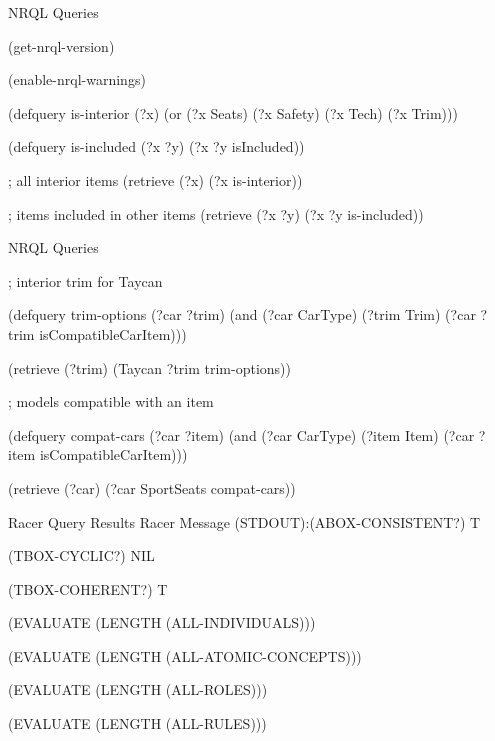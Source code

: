 \documentclass{beamer}
\begin{document}
\begin{frame}{NRQL Queries}
\begin{examples}
(get-nrql-version)
    
(enable-nrql-warnings)

(defquery is-interior (?x) (or (?x Seats) (?x Safety) (?x Tech) (?x Trim)))

(defquery is-included (?x ?y) (?x ?y isIncluded))

; all interior items
(retrieve (?x) (?x is-interior))

; items included in other items
(retrieve (?x ?y) (?x ?y is-included))

\end{examples}
\end{frame}

\begin{frame}{NRQL Queries}
\begin{examples}
; interior trim for Taycan

(defquery trim-options (?car ?trim) (and (?car CarType) (?trim Trim) (?car ?trim isCompatibleCarItem)))

(retrieve (?trim) (Taycan ?trim trim-options))

; models compatible with an item

(defquery compat-cars (?car ?item) (and (?car CarType) (?item Item) (?car ?item isCompatibleCarItem)))

(retrieve (?car) (?car SportSeats compat-cars))
\end{examples}
\end{frame}

\begin{frame}{Racer Query Results}
    Racer Message (STDOUT):(ABOX-CONSISTENT?) \rightarrow T
    
(TBOX-CYCLIC?) \rightarrow NIL

(TBOX-COHERENT?) \rightarrow T

(EVALUATE (LENGTH (ALL-INDIVIDUALS))) 

(EVALUATE (LENGTH (ALL-ATOMIC-CONCEPTS))) 

(EVALUATE (LENGTH (ALL-ROLES))) 

(EVALUATE (LENGTH (ALL-RULES))) 
\end{frame}
\end{document}
